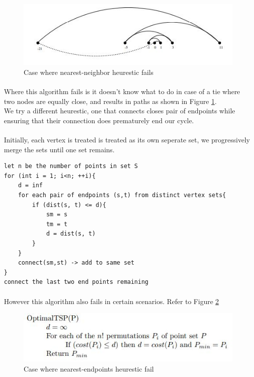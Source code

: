 \documentclass{article}
\begin{document}
\begin{figure}[h]
    \centering
    \includegraphics[width=\linewidth]{./images/robot_tour.JPG}
    \caption{Case where nearest-neighbor heurestic fails}
    \label{fig:nearest_neighbor_fail_case}
\end{figure}

\newpage

\paragraph{}
Where this algorithm fails is it doesn't know what to do in case of a tie where two nodes are equally close, and
results in paths as shown in Figure \ref{fig:nearest_neighbor_fail_case}.
\\
We try a different heurestic, one that connects closes pair of endpoints while ensuring
that their connection does prematurely end our cycle.

\paragraph{}
Initially, each vertex is treated is treated as its own seperate set, we progressively merge the sets
until one set remains.
\begin{lstlisting}
let n be the number of points in set S
for (int i = 1; i<n; ++i){
	d = inf
	for each pair of endpoints (s,t) from distinct vertex sets{
		if (dist(s, t) <= d){
			sm = s
			tm = t 
			d = dist(s, t) 
		}
	}
	connect(sm,st) -> add to same set
}
connect the last two end points remaining
\end{lstlisting}

\paragraph{}
However this algorithm also fails in certain scenarios. 
Refer to Figure \ref{fig:nearest_endpoints_heurestic_fail}

\begin{figure}[h]
    \centering
    \includegraphics[width=\linewidth]{./images/robot_tour_2.JPG}
    \caption{Case where nearest-endpoints heurestic fail}
    \label{fig:nearest_endpoints_heurestic_fail}
\end{figure}
\end{document}
